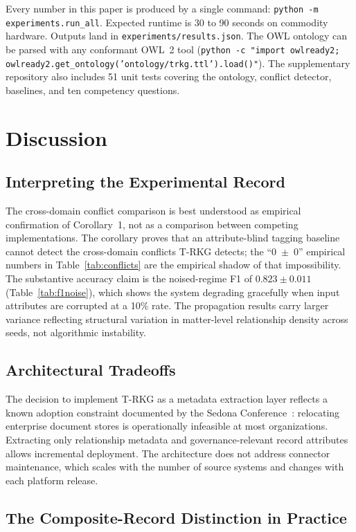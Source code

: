 \documentclass{ieeeaccess}
\begin{document}
Every number in this paper is produced by a single command: \texttt{python -m experiments.run\_all}. Expected runtime is 30 to 90 seconds on commodity hardware. Outputs land in \texttt{experiments/results.json}. The OWL ontology can be parsed with any conformant OWL~2 tool (\texttt{python -c "import owlready2; owlready2.get\_ontology('ontology/trkg.ttl').load()"}). The supplementary repository also includes 51 unit tests covering the ontology, conflict detector, baselines, and ten competency questions.

\section{Discussion}

\subsection{Interpreting the Experimental Record}

The cross-domain conflict comparison is best understood as empirical confirmation of Corollary~1, not as a comparison between competing implementations. The corollary proves that an attribute-blind tagging baseline cannot detect the cross-domain conflicts T-RKG detects; the ``0~$\pm$~0'' empirical numbers in Table~\ref{tab:conflicts} are the empirical shadow of that impossibility. The substantive accuracy claim is the noised-regime F1 of $0.823 \pm 0.011$ (Table~\ref{tab:f1noise}), which shows the system degrading gracefully when input attributes are corrupted at a 10\% rate. The propagation results carry larger variance reflecting structural variation in matter-level relationship density across seeds, not algorithmic instability.

\subsection{Architectural Tradeoffs}

The decision to implement T-RKG as a metadata extraction layer reflects a known adoption constraint documented by the Sedona Conference~\cite{sedona2017}: relocating enterprise document stores is operationally infeasible at most organizations. Extracting only relationship metadata and governance-relevant record attributes allows incremental deployment. The architecture does not address connector maintenance, which scales with the number of source systems and changes with each platform release.

\subsection{The Composite-Record Distinction in Practice}
\end{document}
